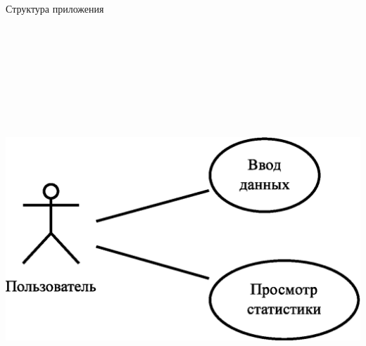 \documentclass[russian,utf8,a1paper,nostitching,simple]{eskdgraph}
\begin{document}
\begin{ESKDdrawing}
  \centering
  {\fontsize{50}{60}\selectfont Структура приложения}

  \vspace{2cm}
  \begin{minipage}{38cm}
    \centering
     \\
    \vspace{2cm}
    \centering
    \includegraphics[height=15cm]{fig/design_use_cases.eps}


\end{minipage}
\end{ESKDdrawing}
\end{document}
